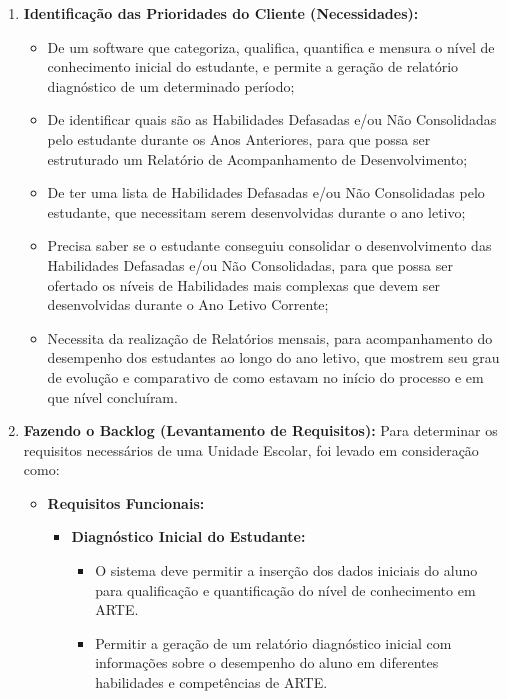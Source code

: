 \begin{enumerate}[label=\arabic*)]
    \item \textbf{Identificação das Prioridades do Cliente (Necessidades):}
    \begin{itemize}[leftmargin=2em]
        \item De um software que categoriza, qualifica, quantifica e mensura o nível de conhecimento inicial do estudante, e permite a geração de relatório diagnóstico de um determinado período;
        \item De identificar quais são as Habilidades Defasadas e/ou Não Consolidadas pelo estudante durante os Anos Anteriores, para que possa ser estruturado um Relatório de Acompanhamento de Desenvolvimento;
        \item De ter uma lista de Habilidades Defasadas e/ou Não Consolidadas pelo estudante, que necessitam serem desenvolvidas durante o ano letivo;
        \item Precisa saber se o estudante conseguiu consolidar o desenvolvimento das Habilidades Defasadas e/ou Não Consolidadas, para que possa ser ofertado os níveis de Habilidades mais complexas que devem ser desenvolvidas durante o Ano Letivo Corrente;
        \item Necessita da realização de Relatórios mensais, para acompanhamento do desempenho dos estudantes ao longo do ano letivo, que mostrem seu grau de evolução e comparativo de como estavam no início do processo e em que nível concluíram.
    \end{itemize}

    \item \textbf{Fazendo o Backlog (Levantamento de Requisitos):}
    Para determinar os requisitos necessários de uma Unidade Escolar, foi levado em consideração como:

    \begin{itemize}[leftmargin=2em]
        \item \textbf{Requisitos Funcionais:}
        \begin{itemize}
            \item \textbf{Diagnóstico Inicial do Estudante:}
            \begin{itemize}
                \item O sistema deve permitir a inserção dos dados iniciais do aluno para qualificação e quantificação do nível de conhecimento em ARTE.
                \item Permitir a geração de um relatório diagnóstico inicial com informações sobre o desempenho do aluno em diferentes habilidades e competências de ARTE.
            \end{itemize}


\end{itemize}
\end{itemize}
\end{enumerate}

